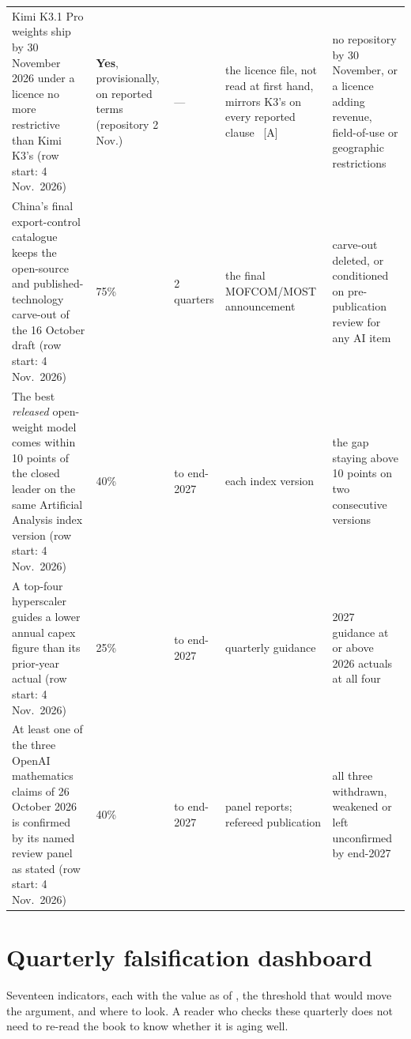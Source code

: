 \begin{small}
\begin{longtable}{p{42mm}p{16mm}p{13mm}p{31mm}p{31mm}}
    Kimi K3.1 Pro weights ship by 30 November 2026 under a licence no more restrictive than Kimi K3's (row start: 4 Nov.\ 2026) & \textbf{Yes}, provisionally, on reported terms (repository 2 Nov.) & --- & the licence file, not read at first hand, mirrors K3's on every reported clause~\cite{lit-k31-weights} [A] & no repository by 30 November, or a licence adding revenue, field-of-use or geographic restrictions \\
    China's final export-control catalogue keeps the open-source and published-technology carve-out of the 16 October draft (row start: 4 Nov.\ 2026) & 75\% & 2 quarters & the final MOFCOM/MOST announcement & carve-out deleted, or conditioned on pre-publication review for any AI item \\
    The best \emph{released} open-weight model comes within 10 points of the closed leader on the same Artificial Analysis index version (row start: 4 Nov.\ 2026) & 40\% & to end-2027 & each index version & the gap staying above 10 points on two consecutive versions \\
    A top-four hyperscaler guides a lower annual capex figure than its prior-year actual (row start: 4 Nov.\ 2026) & 25\% & to end-2027 & quarterly guidance & 2027 guidance at or above 2026 actuals at all four \\
    At least one of the three OpenAI mathematics claims of 26 October 2026 is confirmed by its named review panel as stated (row start: 4 Nov.\ 2026) & 40\% & to end-2027 & panel reports; refereed publication & all three withdrawn, weakened or left unconfirmed by end-2027 \\
\end{longtable}
\end{small}

\section{Quarterly falsification dashboard}

Seventeen indicators, each with the value as of \datafreeze, the threshold that would move the argument, and where to look. A reader who checks these quarterly does not need to re-read the book to know whether it is aging well.


